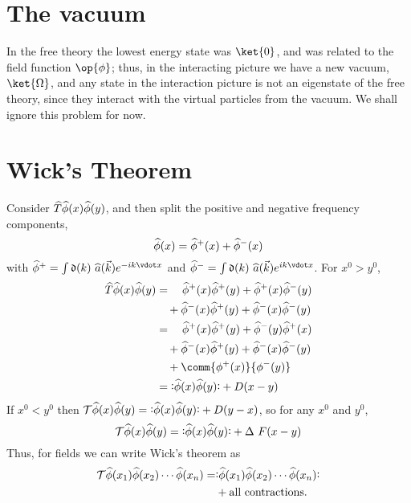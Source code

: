 \section{The vacuum}
\label{sec:vacuum}

In the free theory the lowest energy state was $\ket{0}$, and was
related to the field function $\op{\phi}$; thus, in the interacting
picture we have a new vacuum, $\ket{\Omega}$, and any state in the
interaction picture is not an eigenstate of the free theory, since
they interact with the virtual particles from the vacuum. We shall
ignore this problem for now.

\section{Wick's Theorem}
\label{sec:wicks-theorem}


Consider ${\widehat{T}} {\widehat{\phi}}(x) {\widehat{\phi}}(y)$, and then split the
positive and negative frequency components,
\begin{equation}
  \label{eq:69}
  {\widehat{\phi}}(x) = {\widehat{\phi}}^+(x) + {\widehat{\phi}}^-(x)
\end{equation}
with $\Op{\phi}^+ = \int \nm{k} \Op{a}(\vec{k}) e^{-ik \vdot x}$
and $\Op{\phi}^- = \int \nm{k} \Op{a}(\vec{k}) e^{ik \vdot x}$.
For $x^0 > y^0$,
\begin{align}
  \label{eq:70}
  \Op{T} \Op{\phi}(x) \Op{\phi}(y) &= \quad\Op{\phi}^+(x) \Op{\phi}^+(y) + \Op{\phi}^+(x) \Op{\phi}^-(y) \nonumber\\
                                   &\quad+   \Op{\phi}^-(x) \Op{\phi}^+(y) + \Op{\phi}^-(x) \Op{\phi}^-(y) \nonumber\\
&= \quad\Op{\phi}^+(x) \Op{\phi}^+(y) + \Op{\phi}^-(y) \Op{\phi}^+(x) \nonumber\\
                                   &\quad+   \Op{\phi}^-(x) \Op{\phi}^+(y) + \Op{\phi}^-(x) \Op{\phi}^-(y) \nonumber\\
&\quad+ \comm{\phi^+(x)}{\phi^-(y)} \nonumber\\
&= \normbracket{\Op{\phi}(x) \Op{\phi}(y)} + D(x-y)
\end{align}
If $x^0<y^0$ then
$
  \tOrd \Op{\phi}(x) \Op{\phi}(y) = \normbracket{\Op{\phi}(x) \Op{\phi}(y)} + D(y-x)
$, so for any $x^0$ and $y^0$, 
\begin{equation}
  \label{eq:72}
   \tOrd \Op{\phi}(x) \Op{\phi}(y) = \normbracket{\Op{\phi}(x) \Op{\phi}(y)} + \Delta~F(x-y)
\end{equation}
Thus, for fields we can write Wick's theorem as
\begin{align}
  \tOrd \Op{\phi}(x_1) \Op{\phi}(x_2) \cdots \Op{\phi}(x_n) =& \normbracket{ \Op{\phi}(x_1) \Op{\phi}(x_2) \cdots \Op{\phi}(x_n)}\nonumber\\ &+ \text{all contractions.}
\end{align}

